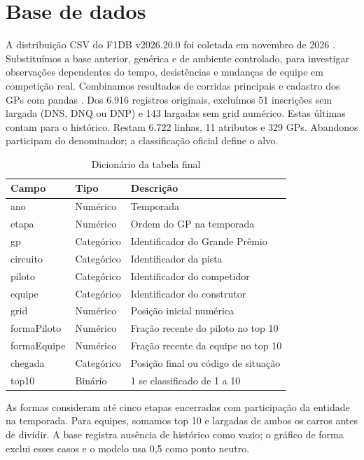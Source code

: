 \documentclass[conference,a4paper]{IEEEtran}
\begin{document}
\section{Base de dados}
A distribuição CSV do F1DB v2026.20.0 foi coletada em novembro de 2026 \cite{f1}. Substituímos a base anterior, genérica e de ambiente controlado, para investigar observações dependentes do tempo, desistências e mudanças de equipe em competição real. Combinamos resultados de corridas principais e cadastro dos GPs com pandas \cite{pd}. Dos 6.916 registros originais, excluímos 51 inscrições sem largada (DNS, DNQ ou DNP) e 143 largadas sem grid numérico. Estas últimas contam para o histórico. Restam 6.722 linhas, 11 atributos e 329 GPs. Abandonos participam do denominador; a classificação oficial define o alvo.
\begin{table}[h]\centering\caption{Dicionário da tabela final}
\begin{tabular}{lll}\hline Campo&Tipo&Descrição\\\hline
ano&Numérico&Temporada\\
etapa&Numérico&Ordem do GP na temporada\\
gp&Categórico&Identificador do Grande Prêmio\\
circuito&Categórico&Identificador da pista\\
piloto&Categórico&Identificador do competidor\\
equipe&Categórico&Identificador do construtor\\
grid&Numérico&Posição inicial numérica\\
formaPiloto&Numérico&Fração recente do piloto no top 10\\
formaEquipe&Numérico&Fração recente da equipe no top 10\\
chegada&Categórico&Posição final ou código de situação\\
top10&Binário&1 se classificado de 1 a 10\\\hline
\end{tabular}\end{table}
As formas consideram até cinco etapas encerradas com participação da entidade na temporada. Para equipes, somamos top 10 e largadas de ambos os carros antes de dividir. A base registra ausência de histórico como vazio; o gráfico de forma exclui esses casos e o modelo usa 0,5 como ponto neutro.
\end{document}
